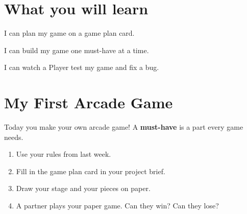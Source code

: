 
\section{What you will learn}
\begin{ican}
  \item I can plan my game on a game plan card.
  \item I can build my game one must-have at a time.
  \item I can watch a Player test my game and fix a bug.
\end{ican}

\section{My First Arcade Game}
Today you make your own arcade game! A \textbf{must-have} is a part every game needs.

\begin{exercise}
\begin{enumerate}[leftmargin=1.4em,itemsep=2pt]
  \item Use your rules from last week.
  \item Fill in the game plan card in your project brief.
  \item Draw your stage and your pieces on paper.
  \item A partner plays your paper game. Can they win? Can they lose?
\end{enumerate}
\end{exercise}

